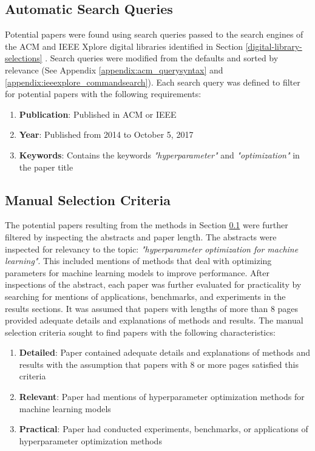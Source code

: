 \subsection{Automatic Search Queries} \label{automatic-search-queries}

Potential papers were found using search queries passed to the search engines of the ACM and IEEE Xplore digital libraries identified in Section \ref{digital-library-selections} \cite{ACM:2017,IEEE:2017}. Search queries were modified from the defaults and sorted by relevance (See Appendix \ref{appendix:acm_querysyntax} and \ref{appendix:ieeexplore_commandsearch}). Each search query was defined to filter for potential papers with the following requirements:

\begin{enumerate}[label=(\alph*)]
	\item \textbf{Publication}: Published in ACM or IEEE
	\item \textbf{Year}: Published from 2014 to October 5, 2017
	\item \textbf{Keywords}: Contains the keywords \textit{"hyperparameter"} and \textit{"optimization"} in the paper title
\end{enumerate}


\subsection{Manual Selection Criteria} \label{manual-selection-criteria}

The potential papers resulting from the methods in Section \ref{automatic-search-queries} were further filtered by inspecting the abstracts and paper length. The abstracts were inspected for relevancy to the topic: \textit{"hyperparameter optimization for machine learning"}. This included mentions of methods that deal with optimizing parameters for machine learning models to improve performance. After inspections of the abstract, each paper was further evaluated for practicality by searching for mentions of applications, benchmarks, and experiments in the results sections. It was assumed that papers with lengths of more than 8 pages provided adequate details and explanations of methods and results. The manual selection criteria sought to find papers with the following characteristics:

\begin{enumerate}[label=(\alph*)]
	\item \textbf{Detailed}: Paper contained adequate details and explanations of methods and results with the assumption that papers with 8 or more pages satisfied this criteria
	\item \textbf{Relevant}: Paper had mentions of hyperparameter optimization methods for machine learning models
	\item \textbf{Practical}: Paper had conducted experiments, benchmarks, or applications of hyperparameter optimization methods
\end{enumerate}



